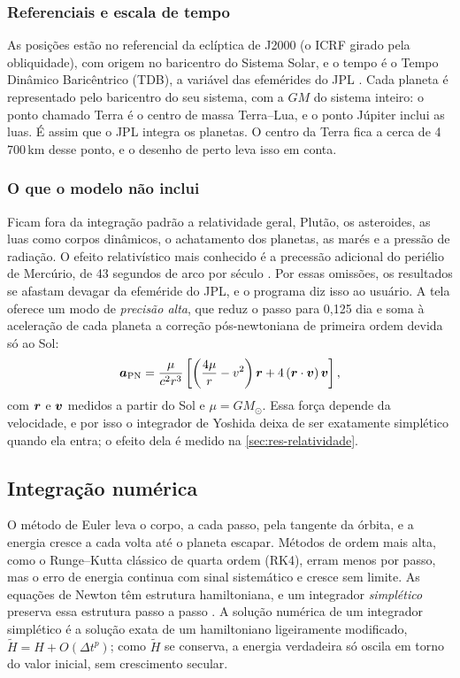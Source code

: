 \subsubsection{Referenciais e escala de tempo}

As posições estão no referencial da eclíptica de J2000 (o ICRF girado pela obliquidade), com origem no baricentro do Sistema Solar, e o tempo é o Tempo Dinâmico Baricêntrico (TDB), a variável das efemérides do JPL \cite{park2021}. Cada planeta é representado pelo baricentro do seu sistema, com a $GM$ do sistema inteiro: o ponto chamado Terra é o centro de massa Terra--Lua, e o ponto Júpiter inclui as luas. É assim que o JPL integra os planetas. O centro da Terra fica a cerca de 4\,700\,km desse ponto, e o desenho de perto leva isso em conta.

\subsubsection{O que o modelo não inclui}\label{sec:nao-inclui}

Ficam fora da integração padrão a relatividade geral, Plutão, os asteroides, as luas como corpos dinâmicos, o achatamento dos planetas, as marés e a pressão de radiação. O efeito relativístico mais conhecido é a precessão adicional do periélio de Mercúrio, de 43 segundos de arco por século \cite{will2018}. Por essas omissões, os resultados se afastam devagar da efeméride do JPL, e o programa diz isso ao usuário. A tela oferece um modo de \emph{precisão alta}, que reduz o passo para 0,125 dia e soma à aceleração de cada planeta a correção pós-newtoniana de primeira ordem devida só ao Sol:
\begin{equation}
  \bm{a}_\text{PN} = \frac{\mu}{c^2 r^3}\left[\left(\frac{4\mu}{r} - v^2\right)\bm{r} + 4\,(\bm{r}\cdot\bm{v})\,\bm{v}\right],
  \label{eq:pn}
\end{equation}
com $\bm{r}$ e $\bm{v}$ medidos a partir do Sol e $\mu = GM_\odot$. Essa força depende da velocidade, e por isso o integrador de Yoshida deixa de ser exatamente simplético quando ela entra; o efeito dela é medido na \autoref{sec:res-relatividade}.

\subsection{Integração numérica}\label{sec:integradores}

O método de Euler leva o corpo, a cada passo, pela tangente da órbita, e a energia cresce a cada volta até o planeta escapar. Métodos de ordem mais alta, como o Runge--Kutta clássico de quarta ordem (RK4), erram menos por passo, mas o erro de energia continua com sinal sistemático e cresce sem limite. As equações de Newton têm estrutura hamiltoniana, e um integrador \emph{simplético} preserva essa estrutura passo a passo \cite{hairer2006}. A solução numérica de um integrador simplético é a solução exata de um hamiltoniano ligeiramente modificado, $\tilde H = H + O(\Delta t^p)$; como $\tilde H$ se conserva, a energia verdadeira só oscila em torno do valor inicial, sem crescimento secular.

